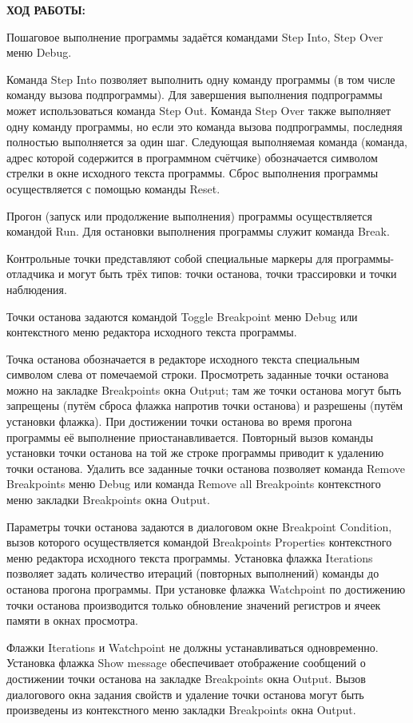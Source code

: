 \documentclass[14pt,a4paper]{extreport}
\newcommand{\header}[1]{%
{
\clearpage%
\fontsize{16pt}{14pt}\selectfont
\begin{center}
\textbf{\MakeUppercase{#1}:}
\end{center}
}
}
\begin{document}
\header{Ход работы}


Пошаговое выполнение программы задаётся командами Step Into, Step Over меню Debug. 

Команда Step Into позволяет выполнить одну команду программы (в том числе команду вызова подпрограммы). Для завершения выполнения подпрограммы может использоваться команда Step Out. Команда Step Over также выполняет одну команду программы, но если это команда вызова подпрограммы, последняя полностью выполняется за один шаг. Следующая выполняемая команда (команда, адрес которой содержится в программном счётчике) обозначается символом стрелки в окне исходного текста программы. Сброс выполнения программы осуществляется с помощью команды Reset.

	Прогон (запуск или продолжение выполнения) программы осуществляется командой Run. Для остановки выполнения программы служит команда Break.

	Контрольные точки представляют собой специальные маркеры для программы-отладчика и могут быть трёх типов: точки останова, точки трассировки и точки наблюдения.

	Точки останова задаются командой Toggle Breakpoint меню Debug или контекстного меню редактора исходного текста программы.

	Точка останова обозначается в редакторе исходного текста специальным символом слева от помечаемой строки. Просмотреть заданные точки останова можно на закладке Breakpoints окна Output; там же точки останова могут быть запрещены (путём сброса флажка напротив точки останова) и разрешены (путём установки флажка). При достижении точки останова во время прогона программы её выполнение приостанавливается. Повторный вызов команды установки точки останова на той же строке программы приводит к удалению точки останова. Удалить все заданные точки останова позволяет команда Remove Breakpoints меню Debug или команда Remove all Breakpoints контекстного меню закладки Breakpoints окна Output.
	
	Параметры точки останова задаются в диалоговом окне Breakpoint Condition, вызов которого осуществляется командой Breakpoints Properties контекстного меню редактора исходного текста программы. Установка флажка Iterations позволяет задать количество итераций (повторных выполнений) команды до останова прогона программы. При установке флажка Watchpoint по достижению точки останова производится только обновление значений регистров и ячеек памяти в окнах просмотра. 
	
	Флажки Iterations и Watchpoint не должны устанавливаться одновременно. Установка флажка Show message обеспечивает отображение сообщений о достижении точки останова на закладке Breakpoints окна Output. Вызов диалогового окна задания свойств и удаление точки останова могут быть произведены из контекстного меню закладки Breakpoints окна Output.
	
\end{document}
